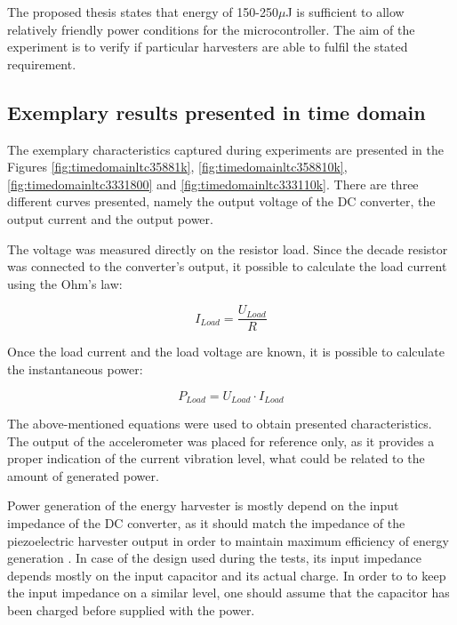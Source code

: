 \documentclass[12pt,a4paper]{article}
\begin{document}
The proposed thesis states that energy of 150-250$\mu$J is sufficient to allow relatively friendly power conditions for the microcontroller. The aim of the experiment is to verify if particular harvesters are able to fulfil the stated requirement.
\subsection{Exemplary results presented in time domain}

The exemplary characteristics captured during experiments are presented in the Figures \ref{fig:timedomainltc35881k}, \ref{fig:timedomainltc358810k}, \ref{fig:timedomainltc3331800} and \ref{fig:timedomainltc333110k}. There are three different curves presented, namely the output voltage of the DC converter, the output current and the output power.
\par

The voltage was measured directly on the resistor load. Since the decade resistor was connected to the converter's output, it possible to calculate the load current using the Ohm's law:

\begin{equation}
	I_{Load} = \frac{U_{Load}}{R}
	\label{eqn:current}
\end{equation}

Once the load current and the load voltage are known, it is possible to calculate the instantaneous power:

\begin{equation}
	P_{Load} = U_{Load} \cdot I_{Load}
	\label{eqn:power}
\end{equation}

The above-mentioned equations were used to obtain presented characteristics. The output of the accelerometer was placed for reference only, as it provides a proper indication of the current vibration level, what could be related to the amount of generated power.

\par
Power generation of the energy harvester is mostly depend on the input impedance of the DC converter, as it should match the impedance of the piezoelectric harvester output in order to maintain maximum efficiency of energy generation \cite{EnHv2}. In case of the design used during the tests, its input impedance depends mostly on the input capacitor and its actual charge. In order to to keep the input impedance on a similar level, one should assume that the capacitor has been charged before  supplied with the power.
\end{document}
